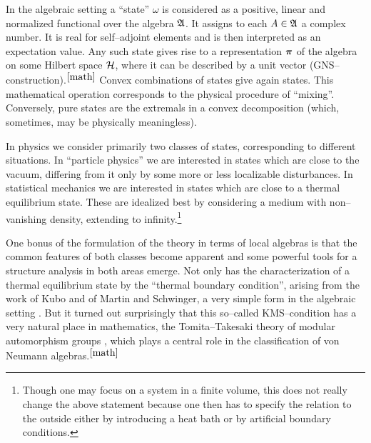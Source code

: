 In the algebraic setting a ``state'' $\omega$ 
is considered as a positive, linear and normalized 
functional over the algebra ${\mathfrak A}$. It assigns 
to each $A \in {\mathfrak A}$ a complex number. It is real for
self--adjoint elements and is then  
interpreted as an expectation value. Any such state  
gives rise to a representation $\mbox{{\boldmath $\pi$}}$ of the algebra
on some Hilbert space $\cal H$, where it can be
described by a unit vector (GNS--construction).$^{{\ref{math}}}$ 
Convex combinations of states give again states. This 
mathematical operation corresponds to the physical 
procedure of ``mixing''. Conversely, pure
states are the extremals in a convex decomposition 
(which, sometimes, may be physically meaningless).  

In physics we consider primarily two classes of states, corresponding
to different situations. In ``particle physics'' we are interested
in states which are close to the vacuum, differing from it only by
some more or less localizable disturbances. In statistical mechanics
we are interested in states which are close to a thermal 
equilibrium state. These are idealized best by considering a medium 
with non--vanishing density, extending to infinity.\footnote{Though
one may focus on a system in a finite volume, this does not really 
change the above statement because one then has to specify the
relation to the outside either by introducing a heat bath or by artificial
boundary conditions.}

One bonus of the formulation of the theory in terms
of local algebras is that the common features of both classes become
apparent and some powerful tools for a structure analysis in both
areas emerge. Not only has the characterization of a thermal
equilibrium state by the ``thermal boundary condition'', arising from the
work of Kubo and of Martin and Schwinger, a very
simple form in the algebraic setting \cite{HaHuWi}. But it turned
out surprisingly that this so--called KMS--condition has a very natural
place in mathematics, the Tomita--Takesaki theory of modular
automorphism groups \cite{Ta}, 
which plays a central role in the classification of
von Neumann algebras.$^{{\ref{math}}}$ 

